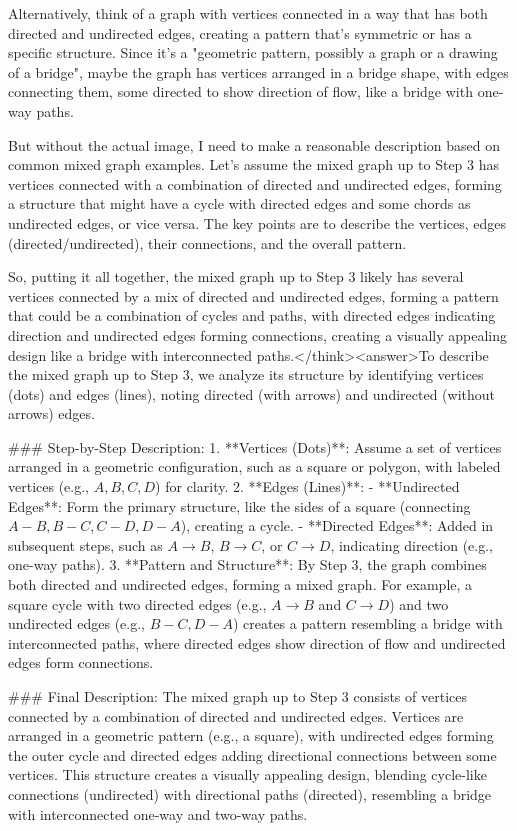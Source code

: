 Alternatively, think of a graph with vertices connected in a way that has both directed and undirected edges, creating a pattern that's symmetric or has a specific structure. Since it's a "geometric pattern, possibly a graph or a drawing of a bridge", maybe the graph has vertices arranged in a bridge shape, with edges connecting them, some directed to show direction of flow, like a bridge with one-way paths.

But without the actual image, I need to make a reasonable description based on common mixed graph examples. Let's assume the mixed graph up to Step 3 has vertices connected with a combination of directed and undirected edges, forming a structure that might have a cycle with directed edges and some chords as undirected edges, or vice versa. The key points are to describe the vertices, edges (directed/undirected), their connections, and the overall pattern.

So, putting it all together, the mixed graph up to Step 3 likely has several vertices connected by a mix of directed and undirected edges, forming a pattern that could be a combination of cycles and paths, with directed edges indicating direction and undirected edges forming connections, creating a visually appealing design like a bridge with interconnected paths.</think><answer>To describe the mixed graph up to Step 3, we analyze its structure by identifying vertices (dots) and edges (lines), noting directed (with arrows) and undirected (without arrows) edges.  

### Step-by-Step Description:  
1. **Vertices (Dots)**: Assume a set of vertices arranged in a geometric configuration, such as a square or polygon, with labeled vertices (e.g., \( A, B, C, D \)) for clarity.  
2. **Edges (Lines)**:  
   - **Undirected Edges**: Form the primary structure, like the sides of a square (connecting \( A-B, B-C, C-D, D-A \)), creating a cycle.  
   - **Directed Edges**: Added in subsequent steps, such as \( A \to B \), \( B \to C \), or \( C \to D \), indicating direction (e.g., one-way paths).  
3. **Pattern and Structure**: By Step 3, the graph combines both directed and undirected edges, forming a mixed graph. For example, a square cycle with two directed edges (e.g., \( A \to B \) and \( C \to D \)) and two undirected edges (e.g., \( B-C, D-A \)) creates a pattern resembling a bridge with interconnected paths, where directed edges show direction of flow and undirected edges form connections.  

### Final Description:  
The mixed graph up to Step 3 consists of vertices connected by a combination of directed and undirected edges. Vertices are arranged in a geometric pattern (e.g., a square), with undirected edges forming the outer cycle and directed edges adding directional connections between some vertices. This structure creates a visually appealing design, blending cycle-like connections (undirected) with directional paths (directed), resembling a bridge with interconnected one-way and two-way paths.  

